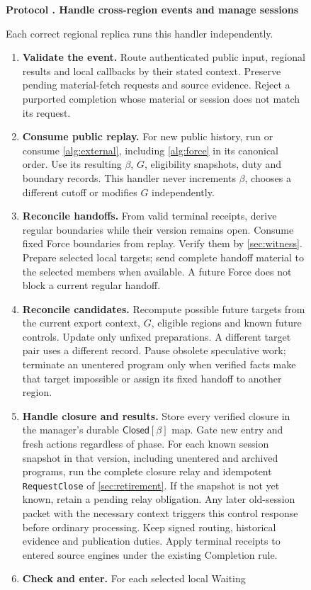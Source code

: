 \documentclass[11pt,a4paper]{article}
\newcommand{\tagg}[1]{\ensuremath{\mathsf{#1}}}
\newcounter{protocol}
\newenvironment{protocol}[3][htbp]{\begin{figure}[#1]\refstepcounter{protocol}\label{#2}
\begin{mdframed}[linewidth=.6pt,skipabove=0pt,skipbelow=0pt,
innertopmargin=7pt,innerbottommargin=7pt]\small
\textbf{Protocol \theprotocol. #3}\par\smallskip}{\end{mdframed}\end{figure}}
\begin{document}
\begin{protocol}[H]{alg:rotation}{Handle cross-region events and manage sessions}
Each correct regional replica runs this handler independently.
\begin{enumerate}[label=\textbf{\arabic*)},itemsep=3pt]
\item \textbf{Validate the event.} Route authenticated public input,
regional results and local callbacks by their stated context. Preserve
pending material-fetch requests and source evidence. Reject a purported completion
whose material or session does not match its request.
\item \textbf{Consume public replay.} For new public history, run or
consume \cref{alg:external}, including \cref{alg:force} in its canonical
order. Use its resulting $\beta$, $G$, eligibility snapshots, duty and
boundary records. This handler never increments $\beta$, chooses a
different cutoff or modifies $G$ independently.
\item \textbf{Reconcile handoffs.} From valid terminal receipts,
derive regular boundaries while their version remains open. Consume
fixed Force boundaries from replay. Verify them by
\cref{sec:witness}. Prepare selected local targets; send complete
handoff material to the selected members when available. A future
Force does not block a current regular handoff.
\item \textbf{Reconcile candidates.} Recompute possible future
targets from the current export context, $G$, eligible regions and
known future controls. Update only unfixed preparations. A different
target pair uses a different record. Pause obsolete speculative work;
terminate an unentered program only when verified facts make that
target impossible or assign its fixed handoff to another region.
\item \textbf{Handle closure and results.} Store every verified closure
in the manager's durable $\tagg{Closed}[\beta]$ map. Gate new entry and
fresh actions regardless of phase. For each known session snapshot in
that version, including unentered and archived programs, run the complete
closure relay and idempotent \texttt{RequestClose} of \cref{sec:retirement}.
If the snapshot is not yet known, retain a pending relay obligation.
Any later old-session packet with the necessary context triggers this
control response before ordinary processing. Keep signed routing,
historical evidence and publication duties. Apply terminal receipts
to entered source engines under the existing Completion rule.
\item \textbf{Check and enter.} For each selected local Waiting

\end{enumerate}
\end{protocol}
\end{document}
